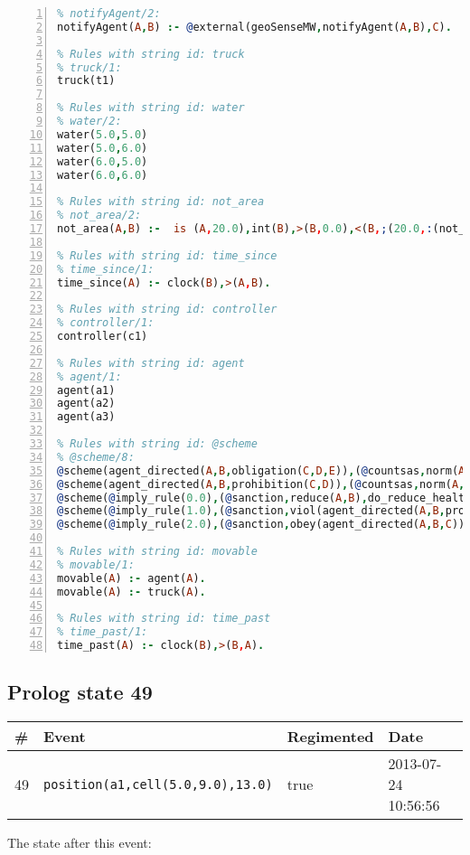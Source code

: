 \documentclass[11pt]{article}\usepackage[utf8]{inputenc}\usepackage{geometry}
\begin{document}
\begin{lstlisting}[language=Prolog, numbers=left]
% Rules with string id: notifyAgent
% notifyAgent/2:
notifyAgent(A,B) :- @external(geoSenseMW,notifyAgent(A,B),C).

% Rules with string id: truck
% truck/1:
truck(t1)

% Rules with string id: water
% water/2:
water(5.0,5.0)
water(5.0,6.0)
water(6.0,5.0)
water(6.0,6.0)

% Rules with string id: not_area
% not_area/2:
not_area(A,B) :-  is (A,20.0),int(B),>(B,0.0),<(B,;(20.0,:(not_area(A,B), is (-(B),20.0)))),int(A),>(A,0.0),<(A,;(20.0,:(area(A,B),-(int(A))))),int(B),>(A,0.0),>(B,0.0),<(A,21.0),<(B,21.0).

% Rules with string id: time_since
% time_since/1:
time_since(A) :- clock(B),>(A,B).

% Rules with string id: controller
% controller/1:
controller(c1)

% Rules with string id: agent
% agent/1:
agent(a1)
agent(a2)
agent(a3)

% Rules with string id: @scheme
% @scheme/8:
@scheme(agent_directed(A,B,obligation(C,D,E)),(@countsas,norm(A,B,F,obligation(C,D,E)),F),false,(listTrue(C)),(time_past(D)),false,[plus(viol(agent_directed(A,B,obligation(C,D,E))))|[]],[plus(obey(agent_directed(A,B,obligation(C,D,E))))|[]])
@scheme(agent_directed(A,B,prohibition(C,D)),(@countsas,norm(A,B,E,prohibition(C,D)),E),(listTrue(C)),false,(false),false,[plus(viol(agent_directed(A,B,prohibition(C,D))))|[]],[plus(obey(agent_directed(A,B,prohibition(C,D))))|[]])
@scheme(@imply_rule(0.0),(@sanction,reduce(A,B),do_reduce_health(A,B),notifyAgent(A,changed(status))),true,false,false,false,[min(reduce(A,B))|[]],[])
@scheme(@imply_rule(1.0),(@sanction,viol(agent_directed(A,B,prohibition(C,D))),do_sanction(D)),true,false,false,false,[min(viol(agent_directed(A,B,prohibition(C,D))))|[]],[])
@scheme(@imply_rule(2.0),(@sanction,obey(agent_directed(A,B,C))),true,false,false,false,[min(obey(agent_directed(A,B,C)))|[]],[])

% Rules with string id: movable
% movable/1:
movable(A) :- agent(A).
movable(A) :- truck(A).

% Rules with string id: time_past
% time_past/1:
time_past(A) :- clock(B),>(B,A).

\end{lstlisting}
\clearpage 
\subsection{Prolog state 49}
\begin{table}[ht]
\centering 
\begin{tabular}{l l l l} 
\textbf{\#} & \textbf{Event} & \textbf{Regimented} & \textbf{Date} \\ [0.5ex] 
\hline
49&\texttt{position(a1,cell(5.0,9.0),13.0)}&true&2013-07-24 10:56:56\\ [1ex] \hline\end{tabular}
\end{table}
The state after this event:
\end{document}

